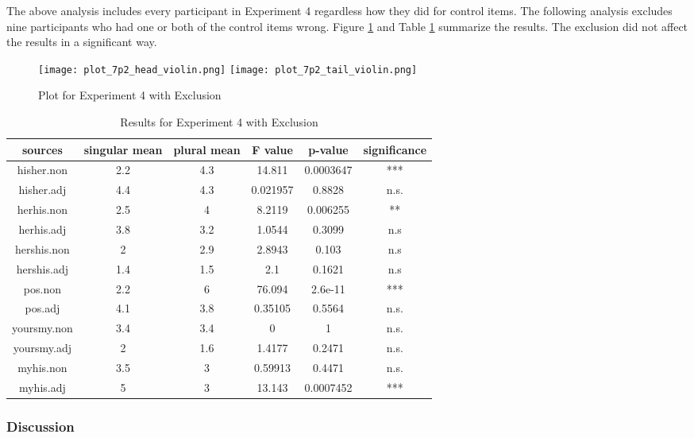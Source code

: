 \documentclass[
  11pt          %
  ,letterpaper  %
  ,center       %
  ,noupper      %
  ]{uconnthesis2}
\begin{document}
The above analysis includes every participant in Experiment 4 regardless how they did for control items. The following analysis excludes nine participants who had one or both of the control items wrong. Figure \ref{fig:ch3exp4b.violin} and Table \ref{tab:ch3exp4b} summarize the results. The exclusion did not affect the results in a significant way.

\begin{figure}[h!] 
\texttt{[image: plot\_7p2\_head\_violin.png]} \centering
\texttt{[image: plot\_7p2\_tail\_violin.png]} \centering
\caption{Plot for Experiment 4 with Exclusion}
\label{fig:ch3exp4b.violin}
\end{figure}

\begin{table}[htb!] \small \centering
\resizebox{0.8\textwidth}{!}
{
\begin{tabular}{ | c | c | c | c | c | c |} \hline 
sources		&	singular mean	&	plural mean 	& 	F value		&	p-value		&	significance	\\ \hline
hisher.non		&	2.2 			&	4.3			&	14.811 		&	0.0003647	&	***			\\ \hline
hisher.adj		&	4.4 			&	4.3			&	0.021957 		&	0.8828		&	n.s.			\\ \hline
herhis.non		&	2.5 			&	4			&	8.2119 		&	0.006255		&	**			\\ \hline
herhis.adj		&	3.8 			&	3.2			&	1.0544 		&	0.3099		&	n.s			\\ \hline
hershis.non	&	2 			&	2.9			&	2.8943  		&	0.103		&	n.s			\\ \hline
hershis.adj	&	1.4 			&	1.5			&	2.1 			&	0.1621		&	n.s			\\ \hline
pos.non		&	2.2 			&	6			&	76.094 		&	2.6e-11		&	***			\\ \hline
pos.adj		&	4.1 			&	3.8			&	0.35105		&	0.5564		&	n.s.			\\ \hline
yoursmy.non	&	3.4  			&	3.4			&	0      			&	1			&	n.s.			\\ \hline
yoursmy.adj	&	2			&	1.6			&	1.4177		&	0.2471		&	n.s.			\\ \hline
myhis.non		&	3.5 			&	3			&	0.59913 		&	0.4471		&	n.s.			\\ \hline
myhis.adj		&	5 			&	3			&	13.143 		&	0.0007452	&	***			\\ \hline
\end{tabular}}
\caption{Results for Experiment 4 with Exclusion} \label{tab:ch3exp4b}
\end{table} 

\subsubsection{Discussion}  
\end{document}
